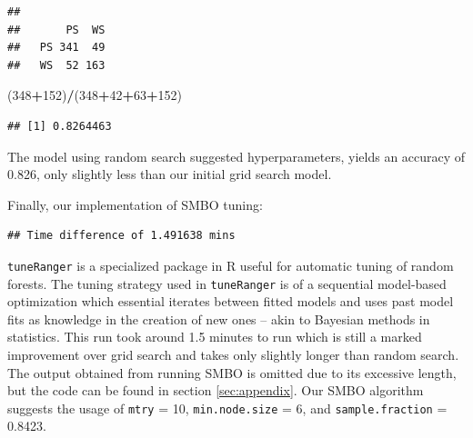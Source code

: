 \documentclass[12pt]{article}
\newenvironment{Shaded}{\begin{snugshade}}{\end{snugshade}}
\newcommand{\CommentTok}[1]{\textcolor[rgb]{0.56,0.35,0.01}{\textit{#1}}}
\newcommand{\DataTypeTok}[1]{\textcolor[rgb]{0.13,0.29,0.53}{#1}}
\newcommand{\DecValTok}[1]{\textcolor[rgb]{0.00,0.00,0.81}{#1}}
\newcommand{\KeywordTok}[1]{\textcolor[rgb]{0.13,0.29,0.53}{\textbf{#1}}}
\newcommand{\NormalTok}[1]{#1}
\newcommand{\OperatorTok}[1]{\textcolor[rgb]{0.81,0.36,0.00}{\textbf{#1}}}
\newcommand{\StringTok}[1]{\textcolor[rgb]{0.31,0.60,0.02}{#1}}
\begin{document}
\begin{Shaded}
\end{Shaded}

\begin{verbatim}
##     
##       PS  WS
##   PS 341  49
##   WS  52 163
\end{verbatim}

\begin{Shaded}
\begin{Highlighting}[]
\NormalTok{(}\DecValTok{348}\OperatorTok{+}\DecValTok{152}\NormalTok{)}\OperatorTok{/}\NormalTok{(}\DecValTok{348}\OperatorTok{+}\DecValTok{42}\OperatorTok{+}\DecValTok{63}\OperatorTok{+}\DecValTok{152}\NormalTok{)}
\end{Highlighting}
\end{Shaded}

\begin{verbatim}
## [1] 0.8264463
\end{verbatim}

The model using random search suggested hyperparameters, yields an
accuracy of 0.826, only slightly less than our initial grid search
model.

Finally, our implementation of SMBO tuning:

\begin{verbatim}
## Time difference of 1.491638 mins
\end{verbatim}

\texttt{tuneRanger} is a specialized package in R useful for automatic
tuning of random forests. The tuning strategy used in
\texttt{tuneRanger} is of a sequential model-based optimization which
essential iterates between fitted models and uses past model fits as
knowledge in the creation of new ones -- akin to Bayesian methods in
statistics. This run took around 1.5 minutes to run which is still a
marked improvement over grid search and takes only slightly longer than
random search. The output obtained from running SMBO is omitted due to
its excessive length, but the code can be found in section
\ref{sec:appendix}. Our SMBO algorithm suggests the usage of
\texttt{mtry} = 10, \texttt{min.node.size} = 6, and
\texttt{sample.fraction} = 0.8423.
\end{document}
